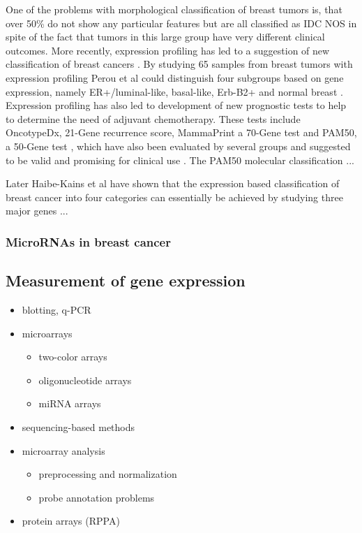 One of the problems with morphological classification of breast tumors is,
that over 50\% do not show any particular features but are all classified as
IDC NOS in spite of the fact that tumors in this large group have very
different clinical outcomes. More recently, expression profiling has led to a
suggestion of new classification of breast cancers \citep{T13, T14}. By studying 65
samples from breast tumors with expression profiling Perou et al could
distinguish four subgroups based on gene expression, namely ER+/luminal-like,
basal-like, Erb-B2+ and normal breast \citep{T13}. Expression profiling has also led
to development of new prognostic tests to help to determine the need of
adjuvant chemotherapy.  These tests include OncotypeDx, 21-Gene recurrence
score, MammaPrint a 70-Gene test and PAM50, a 50-Gene test , which have also
been evaluated by several groups and suggested to be valid and promising for
clinical use \citep{T15}. The PAM50 molecular classification ...

Later Haibe-Kains et al have shown that the expression based classification of
breast cancer into four categories can essentially be achieved by studying
three major genes \citep{T16} ...



\subsubsection{MicroRNAs in breast cancer}








\subsection{Measurement of gene expression}\label{measurement-of-gene-expression}

\begin{itemize}
  \item blotting, q-PCR
  \item microarrays
  \begin{itemize}
    \item two-color arrays
    \item oligonucleotide arrays
    \item miRNA arrays
  \end{itemize}
  \item sequencing-based methods
  \item microarray analysis
  \begin{itemize}
    \item preprocessing and normalization
    \item probe annotation problems
  \end{itemize}
  \item protein arrays (RPPA)
\end{itemize}

